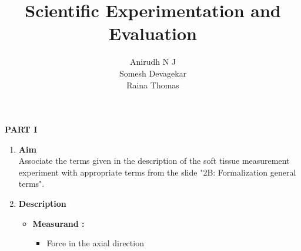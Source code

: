 \documentclass[10pt,a4paper]{article}
\author{\vspace{0.4cm}
	Anirudh N J \\\vspace{0.4cm}
	Somesh Devagekar \\\vspace{0.8cm}
	Raina Thomas}
\title{
	\vspace*{5cm}
	\textbf{Scientific Experimentation and Evaluation}
	}
\begin{document}
	
\begin{titlepage}

	\maketitle
	
\end{titlepage}

\Large\textbf{PART I}	

\Large
\begin{enumerate}[label=\Roman*]
	\item
	\Large{\textbf{Aim}}\\
	
	Associate the terms given in the description of the soft tissue measurement experiment with appropriate terms from the slide "2B: Formalization general terms".
	\vspace{0.3cm}
	\item
	\Large{\textbf{Description}}\\
	
	\begin{itemize}
		\item	
		\textbf{Measurand :}
		\begin{itemize}
			\item
			Force in the axial direction
		\end{itemize}
		

\end{itemize}
\end{enumerate}
\end{document}
